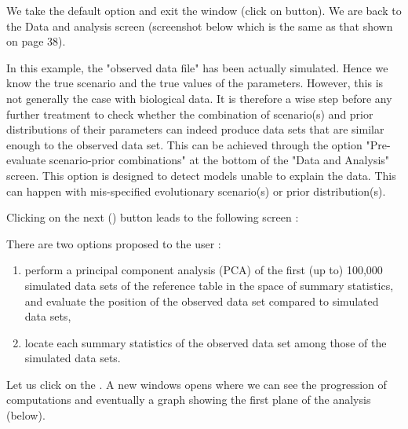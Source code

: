 We take the default option and exit the window (click on  button). We are back to the Data and analysis screen (screenshot below which is the same as that shown on page 38).


In this example, the "observed data file" has been actually simulated. Hence we know the true scenario and the true values of the parameters. However, this is not generally the case with biological data. It is therefore a wise step before any further treatment to check whether the combination of scenario(s) and prior distributions of their parameters can indeed produce data sets that are similar enough to the observed data set. This can be achieved through the option "Pre-evaluate scenario-prior combinations" at the bottom of the "Data and Analysis" screen. This option is designed to detect models unable to explain the data. This can happen with mis-specified  evolutionary scenario(s) or  prior distribution(s).

\newpage
Clicking on the next (\fbox{\textsf{$>>$}}) button leads to the following screen :


 There are two options proposed to the user :
 \begin{enumerate}
 \item perform a principal component analysis (PCA) of the first (up to) 100,000 simulated data sets of the reference table in the space of summary statistics, and evaluate the position of the observed data set compared to simulated data sets,
 \item  locate each summary statistics of the observed data set among those of the simulated data sets.

\end{enumerate}

Let us click on the . A new windows opens where we can see the progression of computations and eventually a graph showing the first plane of the analysis (below).


